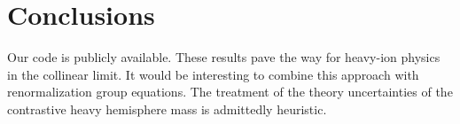 \section{Conclusions}\label{sec:conclusions}

Our code is publicly available. These results pave the way for heavy-ion
physics in the collinear limit. It would be interesting to combine this
approach with renormalization group equations. The treatment of the
theory uncertainties of the contrastive heavy hemisphere mass is
admittedly heuristic.

